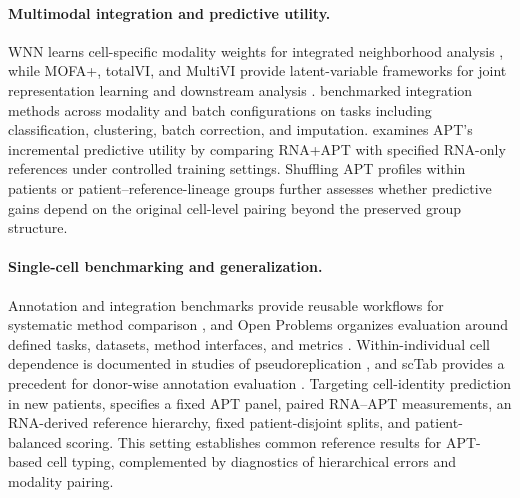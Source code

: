 \paragraph{Multimodal integration and predictive utility.} WNN learns cell-specific modality weights for integrated neighborhood analysis \citep{hao2021integrated}, while MOFA+, totalVI, and MultiVI provide latent-variable frameworks for joint representation learning and downstream analysis \citep{argelaguet2020mofa+,gayoso2021joint,ashuach2023multivi}. \citet{liu2025multitask} benchmarked integration methods across modality and batch configurations on tasks including classification, clustering, batch correction, and imputation. \ourbench{} examines APT's incremental predictive utility by comparing RNA+APT with specified RNA-only references under controlled training settings. Shuffling APT profiles within patients or patient--reference-lineage groups further assesses whether predictive gains depend on the original cell-level pairing beyond the preserved group structure.

\paragraph{Single-cell benchmarking and generalization.} Annotation and integration benchmarks provide reusable workflows for systematic method comparison \citep{abdelaal2019comparison,luecken2022benchmarking}, and Open Problems organizes evaluation around defined tasks, datasets, method interfaces, and metrics \citep{luecken2025defining}. Within-individual cell dependence is documented in studies of pseudoreplication \citep{zimmerman2021practical}, and scTab provides a precedent for donor-wise annotation evaluation \citep{fischer2024sctab}. Targeting cell-identity prediction in new patients, \ourbench{} specifies a fixed APT panel, paired RNA--APT measurements, an RNA-derived reference hierarchy, fixed patient-disjoint splits, and patient-balanced scoring. This setting establishes common reference results for APT-based cell typing, complemented by diagnostics of hierarchical errors and modality pairing.
